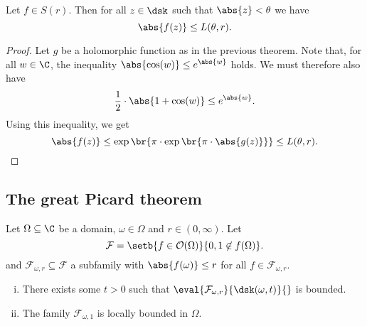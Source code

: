 \begin{izrek}[Schottky]
Let $f \in S(r)$. Then for all $z \in \dsk$ such that
$\abs{z} < \theta$ we have
\[
\abs{f(z)} \leq L(\theta, r).
\]
\end{izrek}

\begin{proof}
Let $g$ be a holomorphic function as in the previous theorem. Note
that, for all $w \in \C$, the inequality
$\abs{\cos(w)} \leq e^{\abs{w}}$ holds. We must therefore also have
\[
\frac{1}{2} \cdot \abs{1 + \cos(w)} \leq e^{\abs{w}}.
\]
Using this inequality, we get
\[
\abs{f(z)} \leq
\exp \br{\pi \cdot \exp \br{\pi \cdot \abs{g(z)}}} \leq
L(\theta, r). \qedhere
\]
\end{proof}

\newpage

\subsection{The great Picard theorem}


\begin{lema}
Let $\Omega \subseteq \C$ be a domain, $\omega \in \Omega$ and
$r \in (0, \infty)$. Let
\[
\mathcal{F} =
\setb{f \in \mathcal{O}(\Omega)}{0, 1 \not \in f(\Omega)}.
\]
and $\mathcal{F}_{\omega,r} \subseteq \mathcal{F}$ a subfamily with
$\abs{f(\omega)} \leq r$ for all $f \in \mathcal{F}_{\omega,r}$.

\begin{enumerate}[i)]
\item There exists some $t > 0$ such that
$\eval{\mathcal{F}_{\omega,r}}{\dsk(\omega,t)}{}$ is bounded.
\item The family $\mathcal{F}_{\omega,1}$ is locally bounded in
$\Omega$.
\end{enumerate}
\end{lema}

